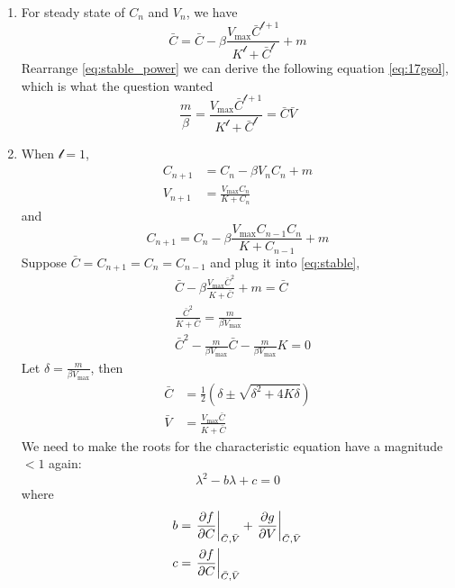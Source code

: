 \begin{homeworkProblem}
\begin{enumerate}
\item For steady state of $C_n$ and $V_n$, we have \begin{equation}
        \bar C = \bar C - \beta \frac{V_{\max} \bar C^{\mathcal{l}+1}}{
        K^{\mathcal{l}} + \bar C^\mathcal{l}} + m \label{eq:stable_power}
\end{equation}
Rearrange \eqref{eq:stable_power} we can derive the following equation 
\eqref{eq:17gsol}, which is what the question wanted
\begin{equation}
    \boxed{\frac{m}{\beta} = \frac{V_{\max} \bar C^{\mathcal{l}+1}}{
            K^{\mathcal{l}} + \bar C^\mathcal{l}} = \bar C \bar V}
    \label{eq:17gsol}
\end{equation}

\pagebreak

\item When $\mathcal{l} = 1$, \[\begin{aligned}
    C_{n+1} &= C_n - \beta V_nC_n + m\\
    V_{n+1} &= \frac{V_{\max}C_n}{K+C_{n}}
\end{aligned}\]
and \begin{equation}
    C_{n+1} = C_n - \beta \frac{V_{\max}C_{n-1}C_n}{K+C_{n-1}}+ m
    \label{eq:stable}
\end{equation}
Suppose $\bar C = C_{n+1} = C_n = C_{n-1}$ and plug it into \eqref{eq:stable},
\begin{align}
    &\bar C - \beta \frac{V_{\max}\bar C^2}{K + \bar C} + m = \bar C\\
    &\frac{\bar C^2}{K + \bar C} = \frac{m}{\beta V_{\max}} \label{eq:sub}\\
    &\bar C^2-\frac{m}{\beta V_{\max}}\bar C - \frac{m}{\beta V_{\max}}K = 0
\end{align}
Let $\delta = \frac{m}{\beta V_{\max}}$, then \[
    \begin{aligned}
        \bar C &= \frac{1}{2}\left(\delta \pm \sqrt{\delta^2+4K\delta}\right)\\
        \bar V &= \frac{V_{\max} \bar C}{K + \bar C}
    \end{aligned}
\]
We need to make the roots for the characteristic equation have a magnitude $< 1$
again:
\[
    \lambda^2 - b\lambda + c = 0
\]
where \[
    \begin{aligned}
        b &= \left.\pderiv{f}{C}\right|_{\bar C, \bar V} +
        \left.\pderiv{g}{V}\right|_{\bar C, \bar V} \\
        c &= \left.\pderiv{f}{C}\right|_{\bar C, \bar V}

\end{aligned}\]
\end{enumerate}
\end{homeworkProblem}
